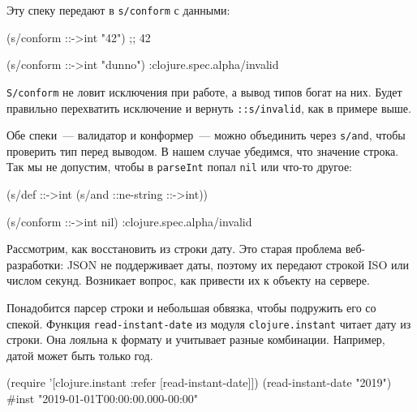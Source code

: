\noindent
Эту спеку передают в \verb|s/conform| с данными:

\begin{english}
  \begin{clojure}
(s/conform ::->int "42") ;; 42

(s/conform ::->int "dunno")
:clojure.spec.alpha/invalid
  \end{clojure}
\end{english}


\verb|S/conform| не ловит исключения при работе, а вывод типов богат на
них. Будет правильно перехватить исключение и вернуть \verb|::s/invalid|, как
в примере выше.

Обе спеки~--- валидатор и конформер~--- можно объединить через \verb|s/and|,
чтобы проверить тип перед выводом. В нашем случае убедимся, что значение
строка. Так мы не допустим, чтобы в \verb|parseInt| попал \verb|nil| или
что-то другое:

\begin{english}
  \begin{clojure}
(s/def ::->int
  (s/and ::ne-string ::->int))

(s/conform ::->int nil)
:clojure.spec.alpha/invalid
  \end{clojure}
\end{english}


Рассмотрим, как восстановить из строки дату. Это старая проблема веб-разработки:
JSON не поддерживает даты, поэтому их передают строкой ISO или числом
секунд. Возникает вопрос, как привести их к объекту на сервере.


Понадобится парсер строки и небольшая обвязка, чтобы подружить его со
спекой. Функция \verb|read-instant-date| из модуля \verb|clojure.instant|
читает дату из строки. Она лояльна к формату и учитывает разные
комбинации. Например, датой может быть только год.


\begin{english}
  \begin{clojure}
(require '[clojure.instant :refer [read-instant-date]])
(read-instant-date "2019")
#inst "2019-01-01T00:00:00.000-00:00"
  \end{clojure}
\end{english}

